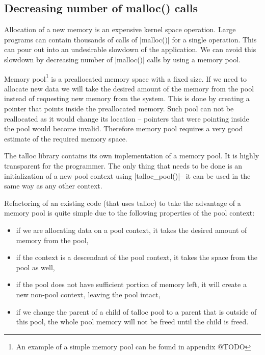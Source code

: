 \subsection{Decreasing number of malloc() calls}
\label{talloc:subsec:pool}


Allocation of a new memory is an expensive kernel space operation. Large
programs can contain thousands of calls of |malloc()| for a single operation.
This can pour out into an undesirable slowdown of the application. We can avoid
this slowdown by decreasing number of |malloc()| calls by using a memory pool.

Memory pool\footnote{An example of a simple memory pool can be found in appendix
@TODO} is a preallocated memory space with a fixed size. If we need to allocate
new data we will take the desired amount of the memory from the pool instead of
requesting new memory from the system. This is done by creating a pointer that
points inside the preallocated memory. Such pool can not be reallocated as it
would change its location -- pointers that were pointing inside the pool would
become invalid. Therefore memory pool requires a very good estimate of the
required memory space.

The talloc library contains its own implementation of a memory pool. It is
highly transparent for the programmer. The only thing that needs to be done is
an initialization of a new pool context using |talloc_pool()|\footnotemark --
it can be used in the same way as any other context.


Refactoring of an existing code (that uses talloc) to take the advantage of a
memory pool is quite simple due to the following properties of the pool context:

\begin{itemize}
  \item if we are allocating data on a pool context, it takes the desired
  amount of memory from the pool,
  \item if the context is a descendant of the pool context, it takes the space
  from the pool as well,
  \item if the pool does not have sufficient portion of memory left, it will
  create a new non-pool context, leaving the pool intact,
  \item if we change the parent of a child of talloc pool to a parent that is
  outside of this pool, the whole pool memory will not be freed until the child
  is freed.
\end{itemize}

